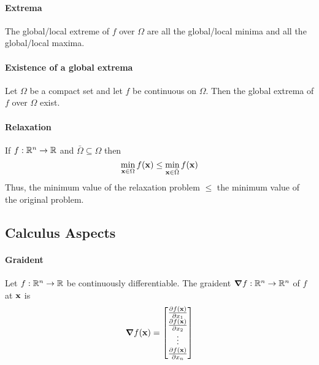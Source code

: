 \paragraph{Extrema}
The global/local extreme of \(f\) over \(\Omega\) are all the global/local minima and all the global/local maxima.

\paragraph{Existence of a global extrema}
Let \(\Omega\) be a compact set and let \(f\) be continuous on \(\Omega\). Then the global extrema of \(f\) over \(\Omega\) exist.

\paragraph{Relaxation}
If \(f: \mathbb{R}^n \to \mathbb{R}\) and \(\bar{\Omega} \subseteq \Omega\) then
\[\min_{\mathbf{x} \in \Omega} f(\mathbf{x}) \leq \min_{\mathbf{x} \in \bar{\Omega}} f(\mathbf{x})\]
Thus, the minimum value of the relaxation problem \(\leq\) the minimum value of the original problem.

\subsection{Calculus Aspects}
\paragraph{Graident}
Let \(f :\mathbb{R}^n \to \mathbb{R}\) be continuously differentiable. The graident \(\grad f: \mathbb{R}^n \to \mathbb{R}^n\) of \(f\) at \(\mathbf{x}\) is
\[\grad f(\mathbf{x}) = \begin{bmatrix}
        \frac{\partial f(\mathbf{x})}{\partial x_1} \\
        \frac{\partial f(\mathbf{x})}{\partial x_2} \\
        \vdots                            \\
        \frac{\partial f(\mathbf{x})}{\partial x_n} \\
    \end{bmatrix}
\]


